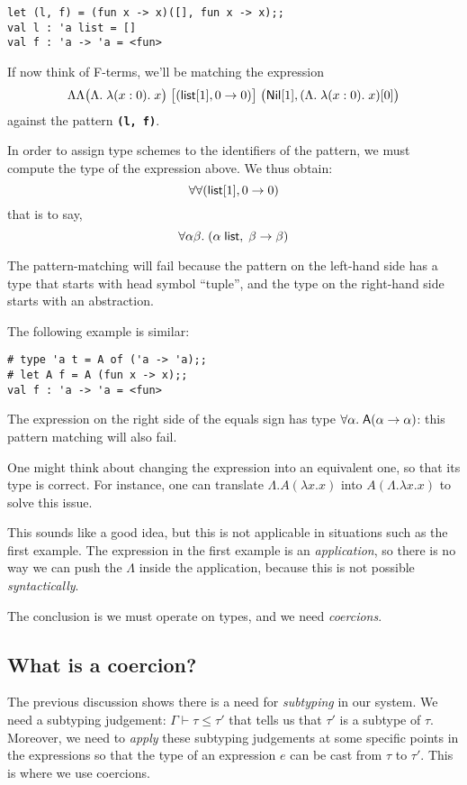 \documentclass[10pt,a4paper,twoside,titlepage,twocolumn]{article}
\newcommand{\code}[1]{\textbf{\texttt{#1}}}
\begin{document}
\begin{verbatim}
let (l, f) = (fun x -> x)([], fun x -> x);;
val l : 'a list = []
val f : 'a -> 'a = <fun>
\end{verbatim}

If now think of F-terms, we'll be matching the expression
$$\Lambda\Lambda \big(\Lambda.\;\lambda (x: 0).\; x\big)
\;\big[(\text{\textsf{list}}[1], 0\to0)\big]
\;\big(\text{\textsf{Nil}}[1], (\Lambda.\;\lambda (x: 0).\; x) [0]\big)
$$
against the pattern \code{(l, f)}.

In order to assign type schemes to the identifiers of the pattern, we must
compute the type of the expression above. We thus obtain:
$$\forall\forall(\text{\textsf{list}}[1],0\to0)$$
that is to say,
$$\forall\alpha\beta.\; (\alpha\;\text{\textsf{list}},\;\beta\to\beta)$$

The pattern-matching will fail because the pattern on the left-hand
side has a type that starts with head symbol ``tuple'', and the type on
the right-hand side starts with an abstraction.

The following example is similar:

\begin{verbatim}
# type 'a t = A of ('a -> 'a);;
# let A f = A (fun x -> x);;
val f : 'a -> 'a = <fun>
\end{verbatim}

The expression on the right side of the
equals sign has type $\forall\alpha.\; \text{\textsf{A}} (\alpha\to\alpha)$: this pattern matching will also fail.

One might think about changing the expression into an equivalent one, so that
its type is correct. For instance, one can translate
$\Lambda.  A(\lambda x. x)$ into $A (\Lambda.\lambda x. x)$ to solve this issue.

This sounds like a good idea, but this is not applicable in situations such as
the first example. The expression in the first example is an
\emph{application}, so there is no way we can push the $\Lambda$ inside the
application, because this is not possible \emph{syntactically}.

The conclusion is we must operate on types, and we need \emph{coercions}.

\subsection{What is a coercion?}

The previous discussion shows there is a need for \emph{subtyping} in our
system. We need a subtyping judgement: $\Gamma \vdash \tau \leq \tau'$ that tells us
that $\tau'$ is a subtype of $\tau$. Moreover, we need to \emph{apply} these subtyping
judgements at some specific points in the expressions so that the type of an
expression $e$ can be cast from $\tau$ to $\tau'$. This is where we use coercions.
\end{document}
